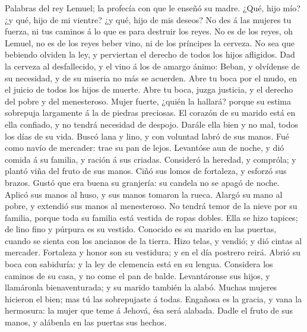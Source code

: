  Palabras del rey Lemuel; la profecía con que le enseñó su
madre.  ¿Qué, hijo mío? ¿y qué, hijo de mi vientre? ¿y
qué, hijo de mis deseos?  No des á las mujeres tu fuerza,
ni tus caminos á lo que es para destruir los reyes.  No es
de los reyes, oh Lemuel, no es de los reyes beber vino, ni de los
príncipes la cerveza.  No sea que bebiendo olviden la ley,
y perviertan el derecho de todos los hijos afligidos.  Dad
la cerveza al desfallecido, y el vino á los de amargo ánimo:
 Beban, y olvídense de su necesidad, y de su miseria no
más se acuerden.  Abre tu boca por el mudo, en el juicio
de todos los hijos de muerte.  Abre tu boca, juzga
justicia, y el derecho del pobre y del menesteroso. 
Mujer fuerte, ¿quién la hallará? porque su estima sobrepuja largamente á
la de piedras preciosas.  El corazón de su marido está en
ella confiado, y no tendrá necesidad de despojo.  Darále
ella bien y no mal, todos los días de su vida.  Buscó
lana y lino, y con voluntad labró de sus manos.  Fué como
navío de mercader: trae su pan de lejos.  Levantóse aun
de noche, y dió comida á su familia, y ración á sus criadas.
 Consideró la heredad, y compróla; y plantó viña del
fruto de sus manos.  Ciñó sus lomos de fortaleza, y
esforzó sus brazos.  Gustó que era buena su granjería: su
candela no se apagó de noche.  Aplicó sus manos al huso,
y sus manos tomaron la rueca.  Alargó su mano al pobre, y
extendió sus manos al menesteroso.  No tendrá temor de la
nieve por su familia, porque toda su familia está vestida de ropas
dobles.  Ella se hizo tapices; de lino fino y púrpura es
su vestido.  Conocido es su marido en las puertas, cuando
se sienta con los ancianos de la tierra.  Hizo telas, y
vendió; y dió cintas al mercader.  Fortaleza y honor son
su vestidura; y en el día postrero reirá.  Abrió su boca
con sabiduría: y la ley de clemencia está en su lengua. 
Considera los caminos de su casa, y no come el pan de balde.
 Levantáronse sus hijos, y llamáronla bienaventurada; y
su marido también la alabó.  Muchas mujeres hicieron el
bien; mas tú las sobrepujaste á todas.  Engañosa es la
gracia, y vana la hermosura: la mujer que teme á Jehová, ésa será
alabada.  Dadle el fruto de sus manos, y alábenla en las
puertas sus hechos.
